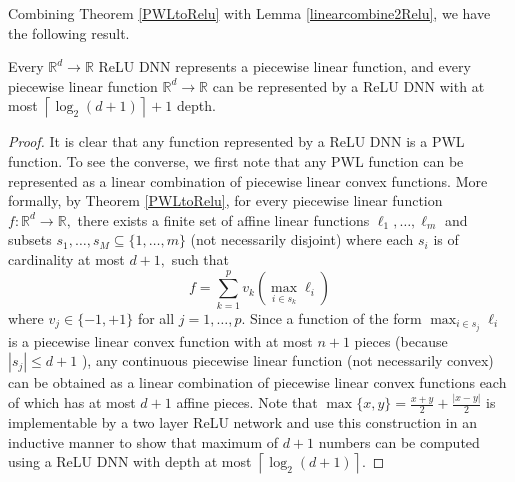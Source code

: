 Combining Theorem \ref{PWLtoRelu} with Lemma \ref{linearcombine2Relu}, we have the following result.
\begin{theorem}
Every $\mathbb{R}^{d} \rightarrow \mathbb{R}$ ReLU DNN represents a piecewise linear function, and every piecewise linear function $\mathbb{R}^{d} \rightarrow \mathbb{R}$ can be represented by a ReLU DNN with at most $\left\lceil\log _{2}(d+1) \right\rceil+1$ depth.
\end{theorem}
\begin{proof}
It is clear that any function represented by a ReLU DNN is a PWL function. To see the converse, we first note that any PWL function can be represented as a linear combination of piecewise linear convex functions. More formally, by Theorem \ref{PWLtoRelu}, for every piecewise linear function $f: \mathbb{R}^{d} \rightarrow \mathbb{R},$ there exists a finite set of affine linear functions $\ell_{1}, \ldots, \ell_{m}$ and subsets $s_{1}, \ldots, s_{M} \subseteq\{1, \ldots, m\}$ (not necessarily disjoint) where each $s_{i}$ is of cardinality at most $d+1,$ such that
$$
f=\sum_{k=1}^{p} v_{k}\left(\max _{i \in s_{k}} \ell_{i}\right)
$$
where $v_{j} \in\{-1,+1\}$ for all $j=1, \ldots, p .$ Since a function of the form $\max _{i \in s_{j}} \ell_{i}$ is a piecewise linear convex function with at most $n+1$ pieces (because $\left|s_{j}\right| \leq d+1$ ),   any continuous piecewise linear function (not necessarily convex) can be obtained as a linear combination of piecewise linear convex functions each of which has at most $d+1$ affine pieces. Note that $\max \{x, y\}=\frac{x+y}{2}+\frac{|x-y|}{2}$ is implementable by a two layer ReLU network and use this construction in an inductive manner to show that maximum of $d+1$ numbers can be computed using a ReLU DNN with depth at most $\left\lceil\log _{2}(d+1)\right\rceil$.
\end{proof}



